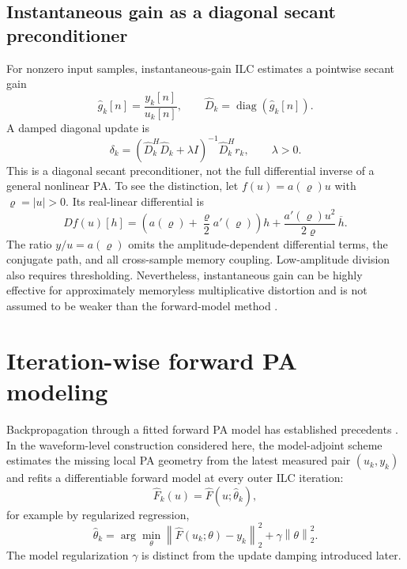 \documentclass[10pt,a4paper]{article}
\newcommand{\norm}[1]{\left\lVert #1\right\rVert_2}
\newcommand{\Fhat}{\widehat F}
\begin{document}
\subsection{Instantaneous gain as a diagonal secant preconditioner}

For nonzero input samples, instantaneous-gain ILC estimates a pointwise secant gain
\begin{equation}
  \widehat g_k[n]=\frac{y_k[n]}{u_k[n]},
  \qquad
  \widehat D_k=\operatorname{diag}(\widehat g_k[n]).
  \label{eq:instantaneous-gain}
\end{equation}
A damped diagonal update is
\begin{equation}
  \delta_k
  =\left(\widehat D_k^H\widehat D_k+\lambda I\right)^{-1}
   \widehat D_k^H r_k,
  \qquad \lambda>0.
  \label{eq:instantaneous-update}
\end{equation}
This is a diagonal secant preconditioner, not the full differential inverse of a general nonlinear PA. To
see the distinction, let $f(u)=a(\varrho)u$ with $\varrho=|u|>0$. Its real-linear differential is
\begin{equation}
  Df(u)[h]
  =\left(a(\varrho)+\frac{\varrho}{2}a'(\varrho)\right)h
  +\frac{a'(\varrho)u^2}{2\varrho}\,\overline h.
  \label{eq:secant-versus-differential}
\end{equation}
The ratio $y/u=a(\varrho)$ omits the amplitude-dependent differential terms, the conjugate path, and all
cross-sample memory coupling. Low-amplitude division also requires thresholding. Nevertheless,
instantaneous gain can be highly effective for approximately memoryless multiplicative distortion and is not
assumed to be weaker than the forward-model method \cite{chani2016ilc,wei2026icg}.

\section{Iteration-wise forward PA modeling}

Backpropagation through a fitted forward PA model has established precedents
\cite{tarver2019backprop,loebl2023memorybackprop}. In the waveform-level construction considered here, the
model-adjoint scheme estimates the missing local PA geometry from the latest measured pair $(u_k,y_k)$ and
refits a differentiable forward model at every outer ILC iteration:
\begin{equation}
  \Fhat_k(u)=\Fhat(u;\widehat\theta_k),
\end{equation}
for example by regularized regression,
\begin{equation}
  \widehat\theta_k
  =\arg\min_\theta
  \left\|\Fhat(u_k;\theta)-y_k\right\|_2^2
  +\gamma\norm{\theta}^{2}.
  \label{eq:model-fit}
\end{equation}
The model regularization $\gamma$ is distinct from the update damping introduced later.
\end{document}
